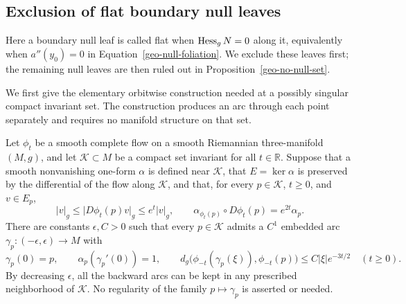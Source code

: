 \subsection{Exclusion of flat boundary null leaves}
\label{geo-flat-subsection}

Here a boundary null leaf is called flat when $\operatorname{Hess}_gN=0$ along it,
equivalently when $a''(y_0)=0$ in Equation~\eqref{geo-null-foliation}.
We exclude these leaves first; the remaining null leaves are then ruled
out in Proposition~\ref{geo-no-null-set}.

We first give the elementary orbitwise construction needed at a possibly
singular compact invariant set.  The construction produces an arc through
each point separately and requires no manifold structure on that set.

\begin{lemma}
\label{geo-flat-fast-arc}
Let $\phi_t$ be a smooth complete flow on a smooth Riemannian
three-manifold $(M,g)$, and let $\mathcal K\subset M$ be a compact set
invariant for all $t\in\mathbb R$.  Suppose that a smooth nonvanishing
one-form $\alpha$ is defined near $\mathcal K$, that
$E=\ker\alpha$ is preserved by the differential of the flow along
$\mathcal K$, and that, for every $p\in\mathcal K$, $t\geq0$, and
$v\in E_p$,
\begin{equation}
\label{geo-flat-rate-hypotheses}
 \lvert v\rvert_g\leq
 \lvert D\phi_t(p)v\rvert_g\leq e^t\lvert v\rvert_g,
 \qquad
 \alpha_{\phi_t(p)}\circ D\phi_t(p)=e^{2t}\alpha_p.
\end{equation}
There are constants $\epsilon,C>0$ such that every $p\in\mathcal K$
admits a $C^1$ embedded arc
$\gamma_p:(-\epsilon,\epsilon)\longrightarrow M$ with
\begin{equation}
\label{geo-flat-arc-conclusion}
 \gamma_p(0)=p,\qquad
 \alpha_p(\gamma_p'(0))=1,\qquad
 d_g\bigl(\phi_{-t}(\gamma_p(\xi)),\phi_{-t}(p)\bigr)
 \leq C\lvert\xi\rvert e^{-3t/2}\quad(t\geq0).
\end{equation}
By decreasing $\epsilon$, all the backward arcs can be kept in any
prescribed neighborhood of $\mathcal K$.  No regularity of the family
$p\mapsto\gamma_p$ is asserted or needed.
\end{lemma}

